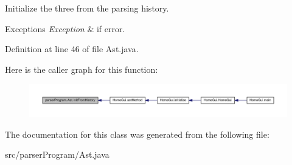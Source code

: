 Initialize the three from the parsing history. 


\begin{DoxyExceptions}{Exceptions}
{\em Exception} & if error. \\
\hline
\end{DoxyExceptions}


Definition at line 46 of file Ast.\-java.



Here is the caller graph for this function\-:\nopagebreak
\begin{figure}[H]
\begin{center}
\leavevmode
\includegraphics[width=350pt]{classparser_program_1_1_ast_a9ad5f3d77935440489df31131b18bf8e_icgraph}
\end{center}
\end{figure}




The documentation for this class was generated from the following file\-:\begin{DoxyCompactItemize}
\item 
src/parser\-Program/Ast.\-java\end{DoxyCompactItemize}

